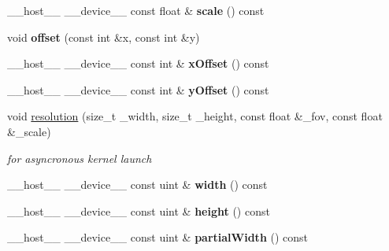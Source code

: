 \begin{DoxyCompactItemize}
\item 
\+\_\+\+\_\+host\+\_\+\+\_\+ \+\_\+\+\_\+device\+\_\+\+\_\+ const float \& {\bfseries scale} () const\hypertarget{struct_camera_a4c28d2e136f8576203213a268df461bc}{}\label{struct_camera_a4c28d2e136f8576203213a268df461bc}

\item 
void {\bfseries offset} (const int \&x, const int \&y)\hypertarget{struct_camera_ac0bcd3aa77ece7888c5bc1c894ae062a}{}\label{struct_camera_ac0bcd3aa77ece7888c5bc1c894ae062a}

\item 
\+\_\+\+\_\+host\+\_\+\+\_\+ \+\_\+\+\_\+device\+\_\+\+\_\+ const int \& {\bfseries x\+Offset} () const\hypertarget{struct_camera_a4d4292bd655023cc379de72e600aa135}{}\label{struct_camera_a4d4292bd655023cc379de72e600aa135}

\item 
\+\_\+\+\_\+host\+\_\+\+\_\+ \+\_\+\+\_\+device\+\_\+\+\_\+ const int \& {\bfseries y\+Offset} () const\hypertarget{struct_camera_af87e905be8647ef1e492f56fe35b243d}{}\label{struct_camera_af87e905be8647ef1e492f56fe35b243d}

\item 
void \hyperlink{struct_camera_ab0cbf1b102afdeb285ef2be271d1701c}{resolution} (size\+\_\+t \+\_\+width, size\+\_\+t \+\_\+height, const float \&\+\_\+fov, const float \&\+\_\+scale)\hypertarget{struct_camera_ab0cbf1b102afdeb285ef2be271d1701c}{}\label{struct_camera_ab0cbf1b102afdeb285ef2be271d1701c}

\begin{DoxyCompactList}\small\item\em for asyncronous kernel launch \end{DoxyCompactList}\item 
\+\_\+\+\_\+host\+\_\+\+\_\+ \+\_\+\+\_\+device\+\_\+\+\_\+ const uint \& {\bfseries width} () const\hypertarget{struct_camera_a558884ad2cb0294e590e92dbfa8c2cd6}{}\label{struct_camera_a558884ad2cb0294e590e92dbfa8c2cd6}

\item 
\+\_\+\+\_\+host\+\_\+\+\_\+ \+\_\+\+\_\+device\+\_\+\+\_\+ const uint \& {\bfseries height} () const\hypertarget{struct_camera_a57d4b05077eb80513ecad514982237ba}{}\label{struct_camera_a57d4b05077eb80513ecad514982237ba}

\item 
\+\_\+\+\_\+host\+\_\+\+\_\+ \+\_\+\+\_\+device\+\_\+\+\_\+ const uint \& {\bfseries partial\+Width} () const\hypertarget{struct_camera_acd260957ed8b8a4eeb9508518208bc0d}{}\label{struct_camera_acd260957ed8b8a4eeb9508518208bc0d}


\end{DoxyCompactItemize}

